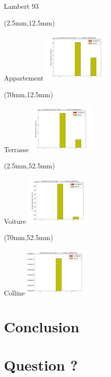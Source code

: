 \documentclass[10pt]{beamer}
\begin{document}
	\begin{frame}{Lambert 93}
	    \begin{textblock*}{60mm}(2.5mm,12.5mm)
	  		\begin{block}{Appartement}
				\includegraphics[width=125px]{../src/data/itinary_1/var_ecart_lambert.png}
			\end{block}
  		\end{textblock*}

  		 \begin{textblock*}{60mm}(70mm,12.5mm)
  		 	\begin{block}{Terrasse}
				\includegraphics[width=125px]{../src/data/itinary_2/var_ecart_lambert.png}
			\end{block}
  		\end{textblock*}

  		\begin{textblock*}{60mm}(2.5mm,52.5mm)
  		 	\begin{block}{Voiture}
				\includegraphics[width=125px]{../src/data/itinary_3/var_ecart_lambert.png}
			\end{block}
  		\end{textblock*}


		\begin{textblock*}{60mm}(70mm,52.5mm)
			\begin{block}{Colline}
				\includegraphics[width=125px]{../src/data/itinary_4/var_ecart_lambert.png}
			\end{block}
		\end{textblock*}
	\end{frame}

	\section{Conclusion}
	\section{Question ?}
\end{document}
